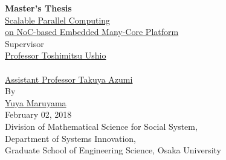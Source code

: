 \documentclass[a4j,12pt,oneside,openany,english]{jsbook}
\date{\today}
\begin{document}
\renewcommand{\headfont}{\bfseries}

\renewcommand{\baselinestretch}{1.1}

\thispagestyle{empty}
\begin{center}
  \vspace*{5mm}
  {\Huge {\bf Master's Thesis}}\\
  \vspace{2cm}
  \vspace{1cm}
  \underline{\LARGE{Scalable Parallel Computing}} \\
  \vspace{0.2cm}
  \underline{\LARGE{on NoC-based Embedded Many-Core Platform}} \\  
  \vspace{0.5cm}
  \vspace{12mm}
  {\large Supervisor}\\
  \vspace{6mm}
  \underline{\Large Professor Toshimitsu Ushio}\\
  　\\
  \underline{\Large Assistant Professor Takuya Azumi}\\
  \vspace{8mm}
  {\large By}\\
  \vspace{6mm}
  \underline{\Large Yuya Maruyama}\\
  \vspace{10mm}
  {\Large February 02, 2018}\\  
  \vspace{14mm}
  {\Large Division of Mathematical Science for Social System,}\\
  {\Large Department of Systems Innovation,}\\
  {\Large Graduate School of Engineering Science, Osaka University}\\
\end{center}
\clearpage
\setcounter{page}{0}
\end{document}

